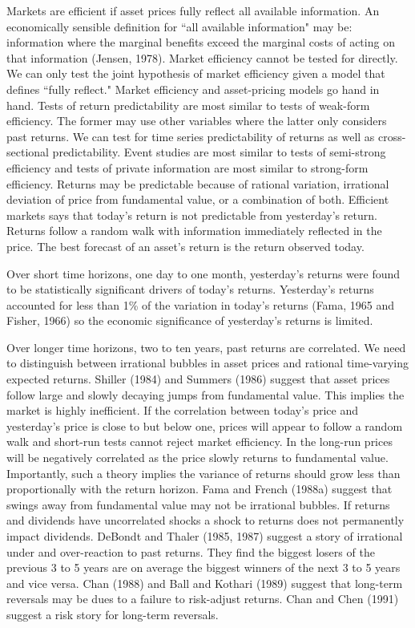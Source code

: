 Markets are efficient if asset prices fully reflect all available information. An
economically sensible definition for ``all available information" may be: information
where the marginal benefits exceed the marginal costs of acting on that information
(Jensen, 1978\cite{jensen1978some}). Market efficiency cannot be tested for directly. We
can only test the joint hypothesis of market efficiency given a model that defines ``fully
reflect." Market efficiency and asset-pricing models go hand in hand. Tests of return
predictability are most similar to tests of weak-form efficiency. The former may use other
variables where the latter only considers past returns. We can test for time series
predictability of returns as well as cross-sectional predictability. Event studies are
most similar to tests of semi-strong efficiency and tests of private information are most
similar to strong-form efficiency. Returns may be predictable because of rational
variation, irrational deviation of price from fundamental value, or a combination of both.
Efficient markets says that today's return is not predictable from yesterday's return.
Returns follow a random walk with information immediately reflected in the price. The best
forecast of an asset's return is the return observed today.

Over short time horizons, one day to one month, yesterday's returns were found to be
statistically significant drivers of today's returns. Yesterday's returns accounted for
less than 1\% of the variation in today's returns (Fama, 1965 and Fisher, 1966) so the
economic significance of yesterday's returns is limited.

Over longer time horizons, two to ten years, past returns are correlated. We need to
distinguish between irrational bubbles in asset prices and rational time-varying expected
returns. Shiller (1984)\cite{shiller1984stock} and Summers (1986)\cite{summers1986does}
suggest that asset prices follow large and slowly decaying jumps from fundamental value.
This implies the market is highly inefficient. If the correlation between today's price
and yesterday's price is close to but below one, prices will appear to follow a random
walk and short-run tests cannot reject market efficiency. In the long-run prices will be
negatively correlated as the price slowly returns to fundamental value. Importantly, such
a theory implies the variance of returns should grow less than proportionally with the
return horizon. Fama and French (1988a)\cite{fama1988permanent} suggest that swings away
from fundamental value may not be irrational bubbles. If returns and dividends have
uncorrelated shocks a shock to returns does not permanently impact dividends. DeBondt and
Thaler (1985, 1987)\cite{bondt1985does}\cite{de1987further} suggest a story of irrational
under and over-reaction to past returns. They find the biggest losers of the previous 3 to
5 years are on average the biggest winners of the next 3 to 5 years and vice versa. Chan
(1988)\cite{chan1988contrarian} and Ball and Kothari (1989)\cite{ball1989nonstationary}
suggest that long-term reversals may be dues to a failure to risk-adjust returns. Chan and
Chen (1991)\cite{chan1991structural} suggest a risk story for long-term reversals.

